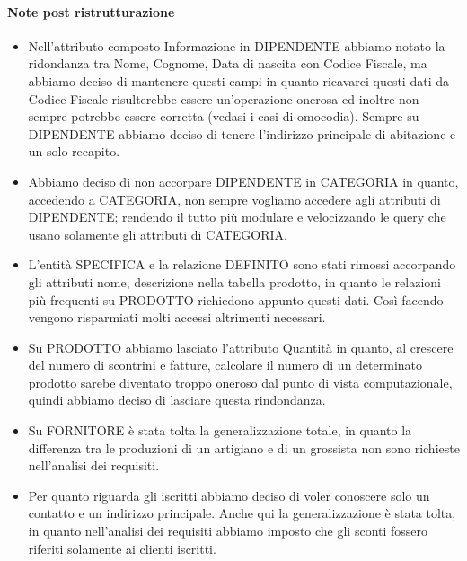 \paragraph*{Note post ristrutturazione}
\begin{itemize}

\item Nell'attributo composto Informazione in DIPENDENTE abbiamo notato la ridondanza tra Nome, Cognome, Data di nascita con Codice Fiscale, ma abbiamo deciso di mantenere questi campi in quanto ricavarci questi dati da Codice Fiscale risulterebbe essere un'operazione onerosa ed inoltre non sempre potrebbe essere corretta (vedasi i casi di omocodia). Sempre su DIPENDENTE abbiamo deciso di tenere l'indirizzo principale di abitazione e un solo recapito.

\item Abbiamo deciso di non accorpare DIPENDENTE in CATEGORIA in quanto, accedendo a CATEGORIA, non sempre vogliamo accedere agli attributi di DIPENDENTE; rendendo il tutto pi\`u modulare e velocizzando le query che usano solamente gli attributi di CATEGORIA.

\item L'entit\`a SPECIFICA e la relazione DEFINITO sono stati rimossi accorpando gli attributi nome, descrizione nella tabella prodotto, in quanto le relazioni pi\`u frequenti su PRODOTTO richiedono appunto questi dati. Cos\`i facendo vengono risparmiati molti accessi altrimenti necessari.

\item Su PRODOTTO abbiamo lasciato l'attributo Quantit\`a in quanto, al crescere del numero di scontrini e fatture, calcolare il numero di un determinato prodotto sarebe diventato troppo oneroso dal punto di vista computazionale, quindi abbiamo deciso di lasciare questa rindondanza.

\item Su FORNITORE \`e stata tolta la generalizzazione totale, in quanto la differenza tra le produzioni di un artigiano e di un grossista non sono richieste nell'analisi dei requisiti.

\item Per quanto riguarda gli iscritti abbiamo deciso di voler conoscere solo un contatto e un indirizzo principale. Anche qui la generalizzazione \`e stata tolta, in quanto nell'analisi dei requisiti abbiamo imposto che gli sconti fossero riferiti solamente ai clienti iscritti.
  
\end{itemize}

